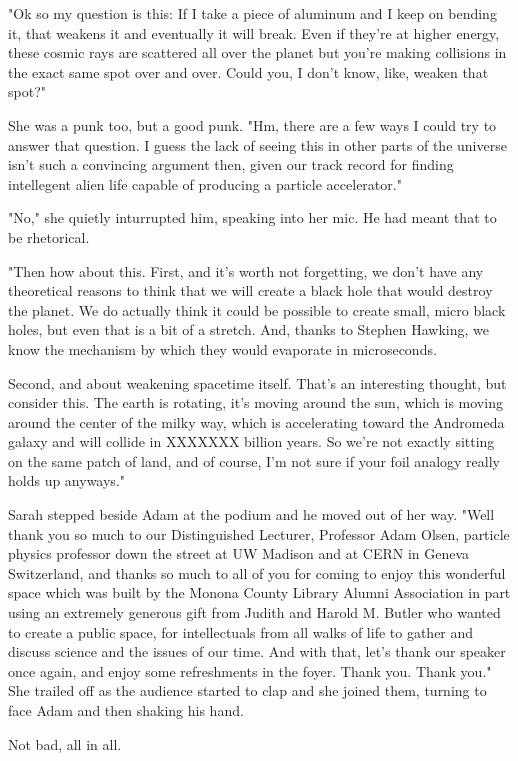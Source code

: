 "Ok so my question is this: If I take a piece of aluminum and I keep on bending it, that weakens it and eventually it will break. Even if they're at higher energy, these cosmic rays are scattered all over the planet but you're making collisions in the exact same spot over and over. Could you, I don't know, like, weaken that spot?"

She was a punk too, but a good punk. "Hm, there are a few ways I could try to answer that question. I guess the lack of seeing this in other parts of the universe isn't such a convincing argument then, given our track record for finding intellegent alien life capable of producing a particle accelerator."

"No," she quietly inturrupted him, speaking into her mic. He had meant that to be rhetorical.

"Then how about this. First, and it's worth not forgetting, we don't have any theoretical reasons to think that we will create a black hole that would destroy the planet. We do actually think it could be possible to create small, micro black holes, but even that is a bit of a stretch. And, thanks to Stephen Hawking, we know the mechanism by which they would evaporate in microseconds.

Second, and about weakening spacetime itself. That's an interesting thought, but consider this. The earth is rotating, it's moving around the sun, which is moving around the center of the milky way, which is accelerating toward the Andromeda galaxy and will collide in XXXXXXX billion years. So we're not exactly sitting on the same patch of land, and of course, I'm not sure if your foil analogy really holds up anyways."

\mypause

Sarah stepped beside Adam at the podium and he moved out of her way. "Well thank you so much to our Distinguished Lecturer, Professor Adam Olsen, particle physics professor down the street at UW Madison and at CERN in Geneva Switzerland, and thanks so much to all of you for coming to enjoy this wonderful space which was built by the Monona County Library Alumni Association in part using an extremely generous gift from Judith and Harold M. Butler who wanted to create a public space, for intellectuals from all walks of life to gather and discuss science and the issues of our time. And with that, let's thank our speaker once again, and enjoy some refreshments in the foyer. Thank you. Thank you." She trailed off as the audience started to clap and she joined them, turning to face Adam and then shaking his hand. 

\mymark

Not bad, all in all. 


